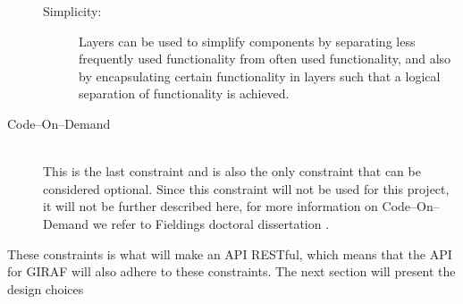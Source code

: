 \begin{description}
\begin{description}
        \item[Simplicity:] Layers can be used to simplify components by separating less frequently used functionality from often used functionality, and also by encapsulating certain functionality in layers such that a logical separation of functionality is achieved.
    \end{description}
    \item [Code--On--Demand] \hfill \\
    This is the last constraint and is also the only constraint that can be considered optional.
    Since this constraint will not be used for this project, it will not be further described here, for more information on Code--On--Demand we refer to Fieldings doctoral dissertation \citep{fielding2000rest}.
\end{description}

These constraints is what will make an API RESTful, which means that the API for GIRAF will also adhere to these constraints.
The next section will present the design choices
